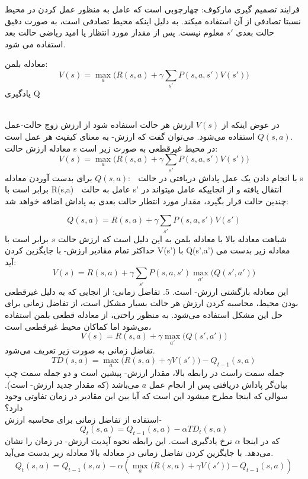 
 فرایند تصمیم گیری مارکوف:
چهارچوبی است که عامل به منظور عمل کردن در محیط نسبتا تصادفی از آن استفاده میکند. به دلیل اینکه محیط تصادفی است، به صورت دقیق حالت بعدی $s'$ معلوم نیست. پس از مقدار مورد انتظار یا امید ریاضی حالت بعد استفاده می شود.

 معادله بلمن:
  \begin{equation}
 	V(s) = \max_{a}\big(R(s,a)+\gamma \sum_{s'}P(s,a,s')V(s')\big)
 \end{equation}
یادگیری Q

\\
 در عوض اینکه از $V(s)$ ارزش هر حالت استفاده شود از ارزش زوج حالت-عمل $Q(s,a)$ استفاده می‌شود. می‌توان گفت که ارزش-  به معنای کیفیت هر عمل است. 
\\
 معادله ارزش حالت s در محیط غیرقطعی به صورت زیر است:
 \begin{equation}
 	V(s) = \max_{a}\big(R(s,a)+\gamma \sum_{s'}P(s,a,s')V(s')\big)
 \end{equation}
برای بدست آوردن معادله $Q(s,a)$:
	با انجام دادن یک عمل پاداش دریافتی در حالت s برابر است با  R(s,a)
	عامل به حالت s’ انتقال یافته و از انجاییکه عامل میتواند در چندین حالت قرار بگیرد، مقدار مورد انتطار حالت بعدی به پاداش اضافه خواهد شد:

\begin{equation}
	Q(s,a) = R(s,a)+\gamma \sum_{s'}P(s,a,s')V(s')
\end{equation}
شباهت معادله بالا با معادله بلمن به این دلیل است که ارزش حالت $s$ برابر است با حداکثر تمام مقادیر ارزش-
با جایگزین کردن V(s’) با Q(s’,a’) معادله زیر بدست می آید:
\begin{equation}
	V(s) = R(s,a)+\gamma \sum_{s'}P(s,a,s')\max_{a'}\big(Q(s',a')\big)
\end{equation}
این معادله بازگشتی ارزش- است. 
5. تفاضل زمانی:
از انجایی که به دلیل غیرقطعی بودن محیط، محاسبه کردن ارزش هر حالت بسیار مشکل است، از تفاضل زمانی برای حل این مشکل استفاده می‌شود.
به منظور راحتی، از معادله قطعی بلمن استفاده می‌شود اما کماکان محیط غیرقطعی است،
\begin{equation}
	V(s) = R(s,a)+\gamma \max_{a'}\big(Q(s',a')\big)
\end{equation}
تفاضل زمانی به صورت زیر تعریف می‌شود.
\begin{equation}
	TD(s, a) = \max_{a}\big(R(s,a)+\gamma V(s')\big) - Q_{t-1}(s,a)
\end{equation}
جمله سمت راست در رابطه بالا، مقدار ارزش- پیشین است و دو جمله سمت چپ بیان‌گر پاداش دریافتی پس از انجام عمل $a$ می‌باشد (که مقدار جدید ارزش- است).
سوالی که اینجا مطرح میشود این است که آیا بین این مقادیر در زمان تفاوتی وجود دارد؟\\
استفاده از تفاضل زمانی برای محاسبه ارزش-
\begin{equation}
	Q_{t}(s,a) = Q_{t-1}(s,a) - \alpha TD_t(s,a)
\end{equation}
که در اینجا $\alpha$ نرخ یادگیری است. این رابطه نحوه آپدیت ارزش- در زمان را نشان می‌دهد. با جایگزین کردن تفاضل زمانی در معادله بالا معادله زیر بدست می‌آید.
\begin{equation}
	Q_{t}(s,a) = Q_{t-1}(s,a) - \alpha \left( \max_{a}\big(R(s,a)+\gamma V(s')\big) - Q_{t-1}(s,a) \right) 
\end{equation}



